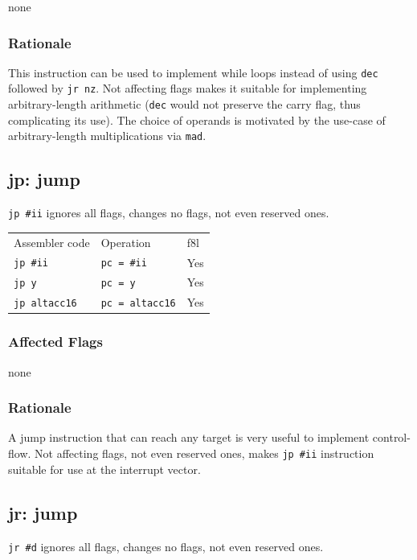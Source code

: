 \documentclass{book}
\begin{document}
none

\subsubsection*{Rationale}

This instruction can be used to implement while loops instead of using \texttt{dec} followed by \texttt{jr nz}. Not affecting flags makes it suitable for implementing arbitrary-length arithmetic (\texttt{dec} would not preserve the carry flag, thus complicating its use). The choice of operands is motivated by the use-case of arbitrary-length multiplications via \texttt{mad}.


\subsection{jp: jump}

\texttt{jp \#ii} ignores all flags, changes no flags, not even reserved ones.

\begin{tabular}{l l l}
Assembler code       & Operation              & f8l \\
\texttt{jp \#ii}     & \texttt{pc = \#ii}     & Yes \\
\texttt{jp y}        & \texttt{pc = y}        & Yes \\
\texttt{jp altacc16} & \texttt{pc = altacc16} & Yes \\
\end{tabular}

\subsubsection*{Affected Flags}

none

\subsubsection*{Rationale}

A jump instruction that can reach any target is very useful to implement control-flow. Not affecting flags, not even reserved ones, makes \texttt{jp \#ii} instruction suitable for use at the interrupt vector.


\subsection{jr: jump}

\texttt{jr \#d} ignores all flags, changes no flags, not even reserved ones.
\end{document}
